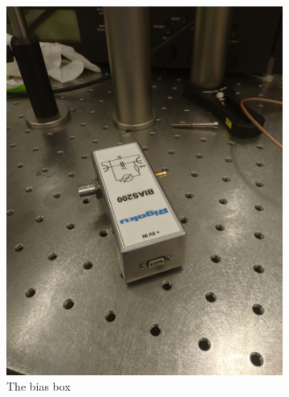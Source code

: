 \documentclass[a4paper, 10pt]{article}
\begin{document}
\begin{figure}[h]
\begin{subfigure}{0.4\textwidth}
        \includegraphics[width=\textwidth,angle=-90]{../images/pin-bias-box.jpg}
        \caption{The bias box}
        \label{fig:pin-diode}
    \end{subfigure}
    \begin{subfigure}{0.4\textwidth}
        \centering

\end{subfigure}
\end{figure}
\end{document}
